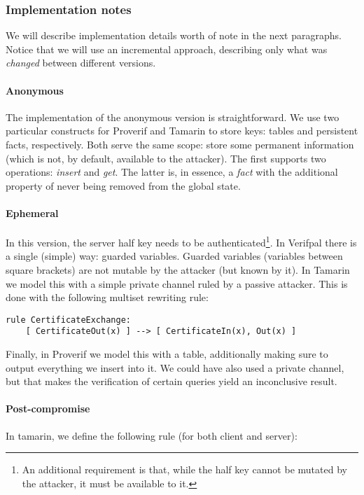 \subsubsection{Implementation notes}

We will describe implementation details worth of note in the next paragraphs. Notice that we will use an incremental approach, describing only what was \textit{changed} between different versions. 

\paragraph{Anonymous} The implementation of the anonymous version is straightforward. We use two particular constructs for Proverif and Tamarin to store keys: tables and persistent facts, respectively. Both serve the same scope: store some permanent information (which is not, by default, available to the attacker). The first supports two operations: \textit{insert} and \textit{get}. The latter is, in essence, a \textit{fact} with the additional property of never being removed from the global state.

\paragraph{Ephemeral} In this version, the server half key needs to be authenticated\footnote{An additional requirement is that, while the half key cannot be mutated by the attacker, it must be available to it.}. In Verifpal there is a single (simple) way: guarded variables. Guarded variables (variables between square brackets) are not mutable by the attacker (but known by it). In Tamarin we model this with a simple private channel ruled by a passive attacker. This is done with the following multiset rewriting rule:


\lstset{language=tamarin}
\begin{lstlisting}
rule CertificateExchange:
    [ CertificateOut(x) ] --> [ CertificateIn(x), Out(x) ]
\end{lstlisting}

Finally, in Proverif we model this with a table, additionally making sure to output everything we insert into it. We could have also used a private channel, but that makes the verification of certain queries yield an inconclusive result.

\paragraph{Post-compromise} In tamarin, we define the following rule (for both client and server):

